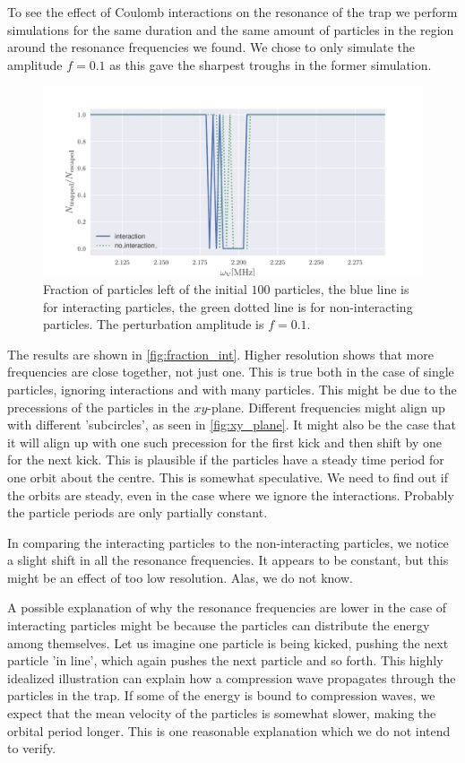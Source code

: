 To see the effect of Coulomb interactions on the resonance of the trap
we perform simulations for the same duration and the same amount of particles
in the region around the resonance frequencies we
found. We chose to only simulate the amplitude $f = 0.1$ as this gave the sharpest troughs
in the former simulation.

\begin{figure}
\centering
\includegraphics[width=1.\linewidth]{../figures/fraction_inter.pdf}
\caption{Fraction of particles left of the initial $100$ particles, the blue line is for interacting particles, 
the green dotted line is for non-interacting particles. The perturbation amplitude is $f = 0.1$. }
\label{fig:fraction_int}
\end{figure}

The results are shown in \autoref{fig:fraction_int}.
Higher resolution shows that more frequencies are close together, not just one. This is
true both in the case of single particles, ignoring interactions and with many particles.
This might be due to the precessions of the particles in the $xy$-plane. Different frequencies might align
up with different 'subcircles', as seen in \autoref{fig:xy_plane}. It might also be the case that it will align
up with one such precession for the first kick and then shift by one for the next kick. This is plausible if the
particles have a steady time period for one orbit about the centre.
This is somewhat speculative. We need to find out if the orbits are steady, even in the case where we ignore
the interactions. Probably the particle periods are only partially constant.

In comparing the interacting particles to the non-interacting particles, we notice a slight
shift in all the resonance frequencies. It appears to be constant, but this might be
an effect of too low resolution. Alas, we do not know.

A possible explanation of why the resonance frequencies are lower in the
case of interacting particles might be because the particles can distribute the energy among
themselves. Let us imagine one particle is being kicked, pushing the next particle 'in line', which again
pushes the next particle and so forth. This highly idealized illustration can explain how a
compression wave propagates through the particles in the trap. If some of the energy is bound to
compression waves, we expect that the mean velocity of the particles is somewhat slower, making the
orbital period longer. This is one reasonable explanation which we do not intend to verify.
